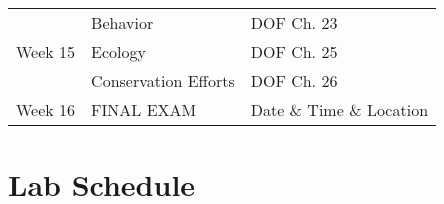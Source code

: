 \documentclass[a4paper]{modular_syllabus} %
\begin{document}
\begin{center}
\begin{tabularx}{\textwidth}{p{2cm}p{8cm}p{9.5cm}}
    & Behavior & DOF Ch. 23 \\
    \arrayrulecolor{maingray}\hline
    Week 15 & Ecology & DOF Ch. 25 \\

    & Conservation Efforts & DOF Ch. 26 \\
    \arrayrulecolor{myCOLOR}\hline
    Week 16 & FINAL EXAM & Date \& Time \& Location \\
    \hline
  \end{tabularx}
\end{center}

\newpage
\section{Lab Schedule}
\end{document}
